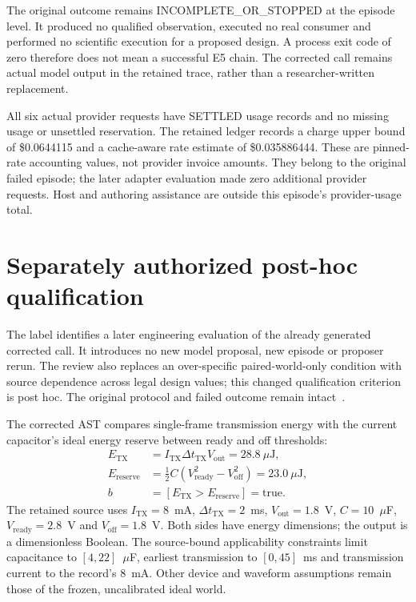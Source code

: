 The original outcome remains INCOMPLETE\_OR\_STOPPED at the episode level.
It produced no qualified observation, executed no real consumer and performed
no scientific execution for a proposed design. A process exit code of zero
therefore does not mean a successful E5 chain. The corrected call remains
actual model output in the retained trace, rather than a researcher-written
replacement.

All six actual provider requests have SETTLED usage records and no missing
usage or unsettled reservation. The retained ledger records a charge upper
bound of \$0.0644115 and a cache-aware rate estimate of \$0.035886444.
These are pinned-rate accounting values, not provider invoice amounts. They
belong to the original failed episode; the later adapter evaluation made zero
additional provider requests. Host and authoring assistance are outside this
episode's provider-usage total.

\section{Separately authorized post-hoc qualification}
The label  identifies a later engineering
evaluation of the already generated corrected call. It introduces no new
model proposal, new episode or proposer rerun. The review also replaces an
over-specific paired-world-only condition with source dependence across legal
design values; this changed qualification criterion is post hoc. The original
protocol and failed outcome remain intact~\cite{adapter}.

The corrected AST compares single-frame transmission energy with the current
capacitor's ideal energy reserve between ready and off thresholds:
\begin{align}
 E_{\mathrm{TX}} &= I_{\mathrm{TX}}\Delta t_{\mathrm{TX}}V_{\mathrm{out}}
                  = 28.8~\mu\mathrm{J},\\
 E_{\mathrm{reserve}} &= \tfrac12 C(V_{\mathrm{ready}}^2-V_{\mathrm{off}}^2)
                  = 23.0~\mu\mathrm{J},\\
 b &= [E_{\mathrm{TX}}>E_{\mathrm{reserve}}]=\mathrm{true}.
\end{align}
The retained source uses $I_{\mathrm{TX}}=8$~mA,
$\Delta t_{\mathrm{TX}}=2$~ms, $V_{\mathrm{out}}=1.8$~V,
$C=10$~$\mu$F, $V_{\mathrm{ready}}=2.8$~V and
$V_{\mathrm{off}}=1.8$~V. Both sides have energy dimensions; the output is a
dimensionless Boolean. The source-bound applicability constraints limit
capacitance to $[4,22]$~$\mu$F, earliest transmission to $[0,45]$~ms and
transmission current to the record's 8~mA. Other device and waveform
assumptions remain those of the frozen, uncalibrated ideal world.


